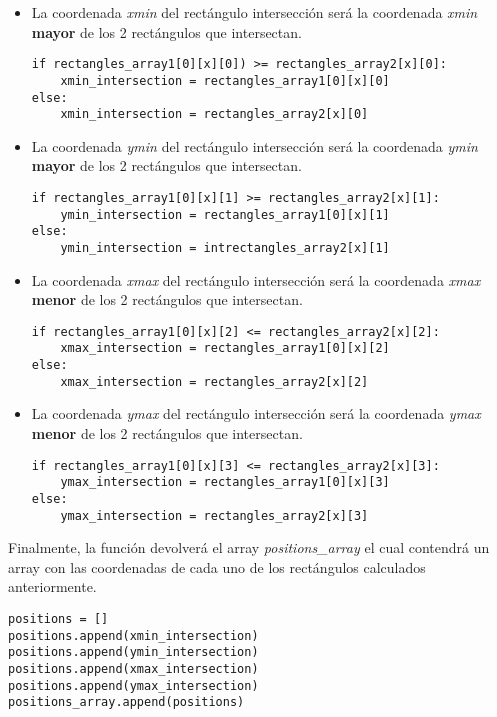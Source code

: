 \documentclass[a4paper, 12pt, oneside]{book}
\begin{document}
\begin{itemize}
\item La coordenada \textit{xmin} del rectángulo intersección será la coordenada \textit{xmin} \textbf{mayor} de los 2 rectángulos que intersectan.\\
\begin{lstlisting}[frame=single]
if rectangles_array1[0][x][0]) >= rectangles_array2[x][0]:
	xmin_intersection = rectangles_array1[0][x][0]
else:
	xmin_intersection = rectangles_array2[x][0]
\end{lstlisting}
\item La coordenada \textit{ymin} del rectángulo intersección será la coordenada \textit{ymin} \textbf{mayor} de los 2 rectángulos que intersectan.\\
\begin{lstlisting}[frame=single]
if rectangles_array1[0][x][1] >= rectangles_array2[x][1]:
	ymin_intersection = rectangles_array1[0][x][1]
else:
	ymin_intersection = intrectangles_array2[x][1]
\end{lstlisting}
\item La coordenada \textit{xmax} del rectángulo intersección será la coordenada \textit{xmax} \textbf{menor} de los 2 rectángulos que intersectan.\\
\begin{lstlisting}[frame=single]
if rectangles_array1[0][x][2] <= rectangles_array2[x][2]:
	xmax_intersection = rectangles_array1[0][x][2]
else:
	xmax_intersection = rectangles_array2[x][2]
\end{lstlisting}
\item La coordenada \textit{ymax} del rectángulo intersección será la coordenada \textit{ymax} \textbf{menor} de los 2 rectángulos que intersectan.\\
\begin{lstlisting}[frame=single]
if rectangles_array1[0][x][3] <= rectangles_array2[x][3]:
	ymax_intersection = rectangles_array1[0][x][3]
else:
	ymax_intersection = rectangles_array2[x][3]
\end{lstlisting}
\end{itemize}

Finalmente, la función devolverá el array \textit{positions\_array} el cual contendrá un array con las coordenadas de cada uno de los rectángulos calculados anteriormente.\\

\begin{lstlisting}[frame=single]
positions = []
positions.append(xmin_intersection)
positions.append(ymin_intersection)
positions.append(xmax_intersection)
positions.append(ymax_intersection)
positions_array.append(positions)
\end{lstlisting}
\end{document}
